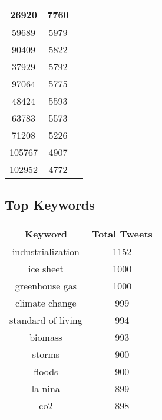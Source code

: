 \documentclass{article}\usepackage[T1]{fontenc}
\begin{document}
\begin{tabular}{|c|c|c|}
 \hline
26920 & 7760\\ 
 \hline
59689 & 5979\\ 
 \hline
90409 & 5822\\ 
 \hline
37929 & 5792\\ 
 \hline
97064 & 5775\\ 
 \hline
48424 & 5593\\ 
 \hline
63783 & 5573\\ 
 \hline
71208 & 5226\\ 
 \hline
105767 & 4907\\ 
 \hline
102952 & 4772\\ 
 \hline
\end{tabular}\subsection*{Top Keywords}\begin{tabular}{|c|c|}         \hline         Keyword & Total Tweets \\ 
 \hline
industrialization & 1152\\ 
 \hline
ice sheet & 1000\\ 
 \hline
greenhouse gas & 1000\\ 
 \hline
climate change & 999\\ 
 \hline
standard of living & 994\\ 
 \hline
biomass & 993\\ 
 \hline
storms & 900\\ 
 \hline
floods & 900\\ 
 \hline
la nina & 899\\ 
 \hline
co2 & 898\\ 
 \hline
\end{tabular}
\end{document}
